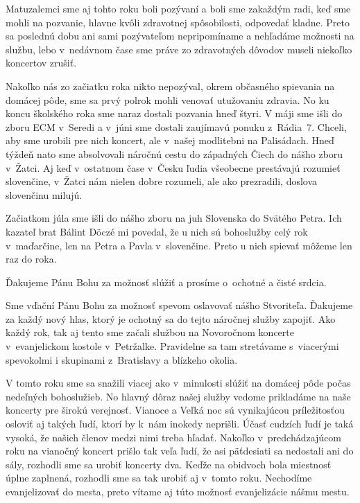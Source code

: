 

Matuzalemci sme  aj tohto roku boli pozývaní a boli sme zakaždým radi, keď sme mohli na pozvanie, hlavne kvôli zdravotnej spôsobilosti, odpovedať kladne. Preto sa poslednú dobu ani sami pozývateľom nepripomíname a nehľadáme možnosti na službu, lebo v~nedávnom čase sme práve zo zdravotných dôvodov museli niekoľko koncertov zrušiť.

Nakoľko nás zo začiatku roka nikto nepozýval, okrem občasného spievania na domácej pôde, sme sa prvý polrok mohli venovať utužovaniu zdravia. No ku koncu školského roka sme naraz dostali pozvania hneď štyri. V máji sme išli do zboru ECM v~Seredi a v~júni sme dostali zaujímavú ponuku z~Rádia~7. Chceli, aby sme urobili pre nich koncert, ale v~našej modlitebni na Palisádach. Hneď týždeň nato sme absolvovali náročnú cestu do západných Čiech do nášho zboru v~Žatci. Aj keď v~ostatnom čase v~Česku ľudia všeobecne prestávajú rozumieť slovenčine, v~Žatci nám nielen dobre rozumeli, ale ako prezradili, doslova slovenčinu milujú.

Začiatkom júla sme išli do nášho zboru na juh Slovenska do Svätého Petra. Ich kazateľ brat Bálint Döczé mi povedal, že u nich sú bohoslužby celý rok v~maďarčine, len na Petra a Pavla v~slovenčine. Preto u nich spievať môžeme len raz do roka.

Ďakujeme Pánu Bohu za možnosť slúžiť a prosíme o~ochotné a čisté srdcia.



Sme vďační Pánu Bohu za možnosť spevom oslavovať nášho Stvoriteľa. Ďakujeme za každý nový hlas, ktorý je ochotný sa do tejto náročnej služby zapojiť.
Ako každý rok, tak aj tento sme začali službou na Novoročnom koncerte v~evanjelickom kostole v~Petržalke. Pravidelne sa tam stretávame s~viacerými spevokolmi i skupinami z~Bratislavy a blízkeho okolia.

V tomto roku sme sa snažili viacej ako v~minulosti slúžiť na domácej pôde počas  nedeľných bohoslužieb.  No hlavný dôraz našej služby vedome prikladáme na naše koncerty pre širokú verejnosť. Vianoce a Veľká noc sú vynikajúcou príležitosťou osloviť aj takých ľudí, ktorí by k~nám inokedy neprišli. Účasť cudzích ľudí je taká vysoká, že našich členov medzi nimi treba hľadať.  Nakoľko v~predchádzajúcom roku na vianočný koncert prišlo tak veľa ľudí, že asi päťdesiati sa nedostali ani do sály, rozhodli sme sa urobiť koncerty dva. Keďže na obidvoch bola miestnosť úplne zaplnená, rozhodli sme sa tak urobiť aj v~tomto roku. Nechodíme evanjelizovať do mesta, preto vítame aj túto možnosť evanjelizácie nášmu mestu.

